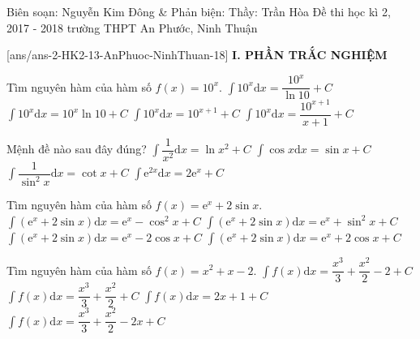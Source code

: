 
\begin{name}
{Biên soạn: Nguyễn Kim Đông \& Phản biện: Thầy: Trần Hòa }
{Đề thi học kì 2, 2017 - 2018 trường THPT An Phước, Ninh Thuận}
\end{name}
\setcounter{ex}{0}\setcounter{bt}{0}
[ans/ans-2-HK2-13-AnPhuoc-NinhThuan-18]
\noindent\textbf{I. PHẦN TRẮC NGHIỆM}
\begin{ex}%
	Tìm nguyên hàm của hàm số $f(x)=10^x$.
	\choice
	{\True $\displaystyle \int 10^x \mathrm{d}x=\dfrac{10^x}{\ln 10}+C$}
	{$\displaystyle \int 10^x \mathrm{d}x=10^x\ln 10+C$}
	{$\displaystyle \int 10^x \mathrm{d}x={10}^{x+1}+C$}
	{$\displaystyle \int 10^x \mathrm{d}x=\dfrac{{10}^{x+1}}{x+1}+C$}
\end{ex}
\begin{ex}%
	Mệnh đề nào sau đây đúng?
	\choice
	{$\displaystyle \int \dfrac{1}{x^2}\mathrm{d}x=\ln x^2+C$}
	{\True $\displaystyle \int \cos x \mathrm{d}x=\sin x+C$}
	{$\displaystyle \int \dfrac{1}{\sin^2x}\mathrm{d}x=\cot x+C$}
	{$\displaystyle \int \mathrm{e}^{2x}\mathrm{d}x=2\mathrm{e}^x+C$}
\end{ex}
\begin{ex}%
	Tìm nguyên hàm của hàm số $f(x)=\mathrm{e}^x+2\sin x$.
	\choice
	{$\displaystyle \int \left(\mathrm{e}^x+2\sin x\right) \mathrm{d}x=\mathrm{e}^x-\cos^2x+C$}
	{$\displaystyle \int \left(\mathrm{e}^x+2\sin x\right) \mathrm{d}x=\mathrm{e}^x+\sin^2x+C$}
	{ \True $\displaystyle \int \left(\mathrm{e}^x+2\sin x\right) \mathrm{d}x=\mathrm{e}^x-2\cos x+C$}
	{$\displaystyle \int \left(\mathrm{e}^x+2\sin x\right) \mathrm{d}x=\mathrm{e}^x+2\cos x+C$}
\end{ex}
\begin{ex}%
Tìm nguyên hàm của hàm số $f(x)=x^2+x-2$.
	\choice
	{$\displaystyle \int f(x)\mathrm{d}x=\dfrac{x^3}{3}+\dfrac{x^2}{2}-2+C$}
	{$\displaystyle \int f(x)\mathrm{d}x=\dfrac{x^3}{3}+\dfrac{x^2}{2}+C$}
	{$\displaystyle \int f(x)\mathrm{d}x=2x+1+C$}
	{\True $\displaystyle \int f(x)\mathrm{d}x=\dfrac{x^3}{3}+\dfrac{x^2}{2}-2x+C$}
\end{ex}
